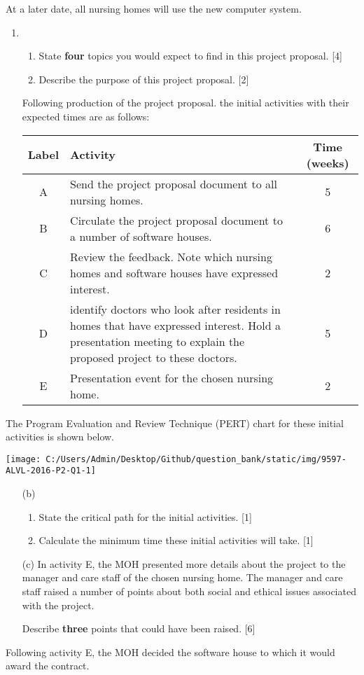 At a later date, all nursing homes will use the new computer system.
\begin{enumerate}
\item {} 
\begin{enumerate}
\item State \textbf{four} topics you would expect to find in this project
proposal.\hfill{} {[}4{]}
\item Describe the purpose of this project proposal. \hfill{}{[}2{]}
\end{enumerate}
Following production of the project proposal. the initial activities
with their expected times are as follows:
\begin{center}
\begin{tabular}{|c|>{\raggedright}p{}|c|}
\hline 
\textbf{Label} & \texttt{\textbf{\hspace{0.01\columnwidth}}}\textbf{Activity } & \textbf{Time (weeks)}\tabularnewline
\hline 
A & Send the project proposal document to all nursing homes. & 5\tabularnewline
\hline 
B & Circulate the project proposal document to a number of software houses. & 6\tabularnewline
\hline 
C & Review the feedback. Note which nursing homes and software houses
have expressed interest.  & 2\tabularnewline
\hline 
D & identify doctors who look after residents in homes that have expressed
interest. Hold a presentation meeting to explain the proposed project
to these doctors. & 5\tabularnewline
\hline 
E & Presentation event for the chosen nursing home. & 2\tabularnewline
\hline 
\end{tabular}
\par\end{center}

\end{enumerate}
The Program Evaluation and Review Technique (PERT) chart for these
initial activities is shown below. 
\begin{center}
\texttt{[image: C:/Users/Admin/Desktop/Github/question\_bank/static/img/9597-ALVL-2016-P2-Q1-1]}
\par\end{center}
\begin{enumerate}
\item[(b)] {}
\begin{enumerate}
\item State the critical path for the initial activities. \hfill{}{[}1{]}
\item Calculate the minimum time these initial activities will take.\hfill{}
{[}1{]}
\end{enumerate}
\item[(c)] In activity E, the MOH presented more details about the project to
the manager and care staff of the chosen nursing home. The manager
and care staff raised a number of points about both social and ethical
issues associated with the project. 

Describe \textbf{three} points that could have been raised.\hfill{}
{[}6{]}
\end{enumerate}
Following activity E, the MOH decided the software house to which
it would award the contract. 

